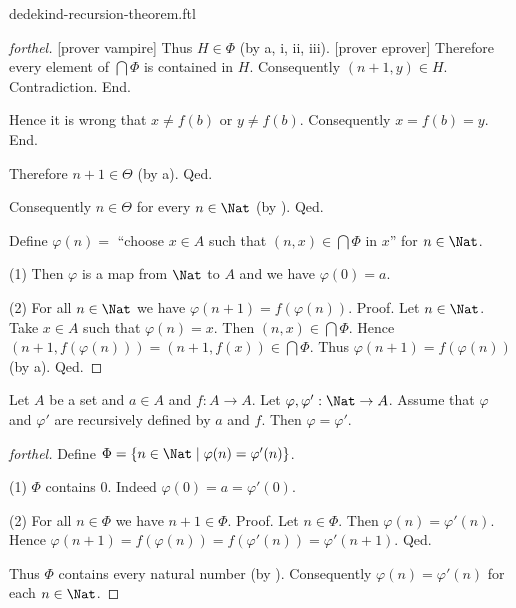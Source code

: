 \documentclass{naproche-library}
\begin{document}
\begin{smodule}[title=Dedekind's Recursion Theorem]{dedekind-recursion-theorem.ftl}
\begin{proof}[forthel]
          [prover vampire]
          Thus $H \in \Phi$ (by a, i, ii, iii).
          [prover eprover]
          Therefore every element of $\bigcap \Phi$ is contained in $H$.
          Consequently $(n + 1,y) \in H$.
          Contradiction.
        End.

        Hence it is wrong that $x \neq f(b)$ or $y \neq f(b)$.
        Consequently $x = f(b) = y$.
      End.

      Therefore $n + 1 \in \Theta$ (by a).
    Qed.

    Consequently $n \in \Theta$ for every $n \in \Nat$ (by ).
  Qed.

  Define $\varphi(n) =$ ``choose $x \in A$ such that $(n, x) \in
  \bigcap \Phi$ in $x$'' for $n \in \Nat$.

  (1) Then $\varphi$ is a map from $\Nat$ to $A$ and we have
  $\varphi(0) = a$.

  (2) For all $n \in \Nat$ we have $\varphi(n + 1) =
  f(\varphi(n))$. \newline
  Proof.
    Let $n \in \Nat$.
    Take $x \in A$ such that $\varphi(n) = x$.
    Then $(n, x) \in \bigcap \Phi$.
    Hence $(n + 1, f(\varphi(n))) = (n + 1, f(x)) \in \bigcap \Phi$.
    Thus $\varphi(n + 1) = f(\varphi(n))$ (by a).
  Qed.
\end{proof}

\begin{theorem*}[forthel,title=Dedekind's Recursion Theorem: Uniqueness,id=dedekind_uniqueness]
  Let $A$ be a set and $a \in A$ and $f : A \to A$.
  Let $\varphi, \varphi' : \Nat \to A$.
  Assume that $\varphi$ and $\varphi'$ are recursively defined by $a$ and
  $f$.
  Then $\varphi = \varphi'$.
\end{theorem*}
\begin{proof}[forthel]
  Define $\Phi = \{ n \in \Nat \mid \varphi(n) = \varphi'(n) \}$.

  (1) $\Phi$ contains $0$.
  Indeed $\varphi(0) = a = \varphi'(0)$.

  (2) For all $n \in \Phi$ we have $n + 1 \in \Phi$. \newline
  Proof.
    Let $n \in \Phi$.
    Then $\varphi(n) = \varphi'(n)$.
    Hence $\varphi(n + 1)
      = f(\varphi(n))
      = f(\varphi'(n))
      = \varphi'(n + 1)$.
  Qed.

  Thus $\Phi$ contains every natural number (by ).
  Consequently $\varphi(n) = \varphi'(n)$ for each $n \in \Nat$.
\end{proof}
\end{smodule}
\end{document}

